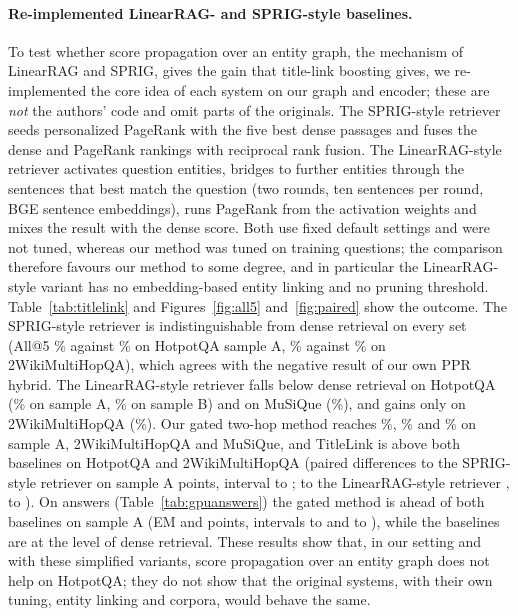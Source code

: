\documentclass[a4paper,fleqn]{cas-sc}
\begin{document}
\paragraph{Re-implemented LinearRAG- and SPRIG-style baselines.}
To test whether score propagation over an entity graph, the mechanism of LinearRAG and SPRIG, gives the gain that title-link boosting gives, we re-implemented the core idea of each system on our graph and encoder; these are \emph{not} the authors' code and omit parts of the originals. The SPRIG-style retriever seeds personalized PageRank with the five best dense passages and fuses the dense and PageRank rankings with reciprocal rank fusion. The LinearRAG-style retriever activates question entities, bridges to further entities through the sentences that best match the question (two rounds, ten sentences per round, BGE sentence embeddings), runs PageRank from the activation weights and mixes the result with the dense score. Both use fixed default settings and were not tuned, whereas our method was tuned on training questions; the comparison therefore favours our method to some degree, and in particular the LinearRAG-style variant has no embedding-based entity linking and no pruning threshold. Table~\ref{tab:titlelink} and Figures~\ref{fig:all5} and~\ref{fig:paired} show the outcome. The SPRIG-style retriever is indistinguishable from dense retrieval on every set (All@5 \GpuHASprigAll\% against \GpuHADenseAll\% on HotpotQA sample A, \GpuTWSprigAll\% against \GpuTWDenseAll\% on 2WikiMultiHopQA), which agrees with the negative result of our own PPR hybrid. The LinearRAG-style retriever falls below dense retrieval on HotpotQA (\GpuHALinAll\% on sample A, \GpuHBLinAll\% on sample B) and on MuSiQue (\GpuMQLinAll\%), and gains only on 2WikiMultiHopQA (\GpuTWLinAll\%). Our gated two-hop method reaches \GpuHAGateAll\%, \GpuTWGateAll\% and \GpuMQGateAll\% on sample A, 2WikiMultiHopQA and MuSiQue, and TitleLink is above both baselines on HotpotQA and 2WikiMultiHopQA (paired differences to the SPRIG-style retriever on sample A \GpuPairHATLvSprigD{} points, interval \GpuPairHATLvSprigLo{} to \GpuPairHATLvSprigHi{}; to the LinearRAG-style retriever \GpuPairHATLvLinD{}, \GpuPairHATLvLinLo{} to \GpuPairHATLvLinHi{}). On answers (Table~\ref{tab:gpuanswers}) the gated method is ahead of both baselines on sample A (EM \GpuPaAGatevSprigEMD{} and \GpuPaAGatevLinEMD{} points, intervals \GpuPaAGatevSprigEMLo{} to \GpuPaAGatevSprigEMHi{} and \GpuPaAGatevLinEMLo{} to \GpuPaAGatevLinEMHi{}), while the baselines are at the level of dense retrieval. These results show that, in our setting and with these simplified variants, score propagation over an entity graph does not help on HotpotQA; they do not show that the original systems, with their own tuning, entity linking and corpora, would behave the same.
\end{document}
